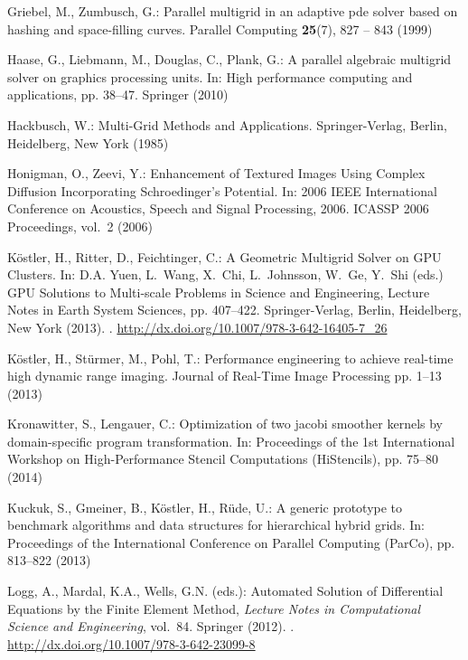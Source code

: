 \documentclass[onecolumn]{svjour3}
\begin{document}
\begin{thebibliography}{10}
Griebel, M., Zumbusch, G.: Parallel multigrid in an adaptive pde solver based
  on hashing and space-filling curves.
\newblock Parallel Computing \textbf{25}(7), 827 -- 843 (1999)

Haase, G., Liebmann, M., Douglas, C., Plank, G.: A parallel algebraic multigrid
  solver on graphics processing units.
\newblock In: High performance computing and applications, pp. 38--47. Springer
  (2010)

Hackbusch, W.: Multi-Grid Methods and Applications.
\newblock Springer-Verlag, Berlin, Heidelberg, New York (1985)

Honigman, O., Zeevi, Y.: {Enhancement of Textured Images Using Complex
  Diffusion Incorporating Schroedinger's Potential}.
\newblock In: 2006 IEEE International Conference on Acoustics, Speech and
  Signal Processing, 2006. ICASSP 2006 Proceedings, vol.~2 (2006)

K\"ostler, H., Ritter, D., Feichtinger, C.: {A Geometric Multigrid Solver on
  GPU Clusters}.
\newblock In: D.A. Yuen, L.~Wang, X.~Chi, L.~Johnsson, W.~Ge, Y.~Shi (eds.) GPU
  Solutions to Multi-scale Problems in Science and Engineering, Lecture Notes
  in Earth System Sciences, pp. 407--422. Springer-Verlag, Berlin, Heidelberg,
  New York (2013).
\newblock {}.
\newblock \urlprefix\url{http://dx.doi.org/10.1007/978-3-642-16405-7_26}

K{\"o}stler, H., St{\"u}rmer, M., Pohl, T.: Performance engineering to achieve
  real-time high dynamic range imaging.
\newblock Journal of Real-Time Image Processing pp. 1--13 (2013)

Kronawitter, S., Lengauer, C.: Optimization of two jacobi smoother kernels by
  domain-specific program transformation.
\newblock In: Proceedings of the 1st International Workshop on High-Performance
  Stencil Computations (HiStencils), pp. 75--80 (2014)

Kuckuk, S., Gmeiner, B., K\"ostler, H., R\"ude, U.: A generic prototype to
  benchmark algorithms and data structures for hierarchical hybrid grids.
\newblock In: Proceedings of the International Conference on Parallel Computing
  (ParCo), pp. 813--822 (2013)

Logg, A., Mardal, K.A., Wells, G.N. (eds.): Automated Solution of Differential
  Equations by the Finite Element Method, \emph{Lecture Notes in Computational
  Science and Engineering}, vol.~84.
\newblock Springer (2012).
\newblock {}.
\newblock \urlprefix\url{http://dx.doi.org/10.1007/978-3-642-23099-8}


\end{thebibliography}
\end{document}
